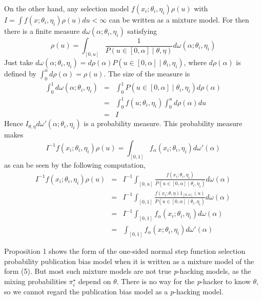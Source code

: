 \documentclass[english]{article}
\begin{document}
On the other hand, any selection model $f(x_{i};\theta_{i},\eta_{i})\rho(u)$ with $I =\int f(x;\theta_{i},\eta_{i})\rho(u)du<\infty$ can be written as a mixture model. For then there is a finite measure $d\omega(\alpha;\theta_{i},\eta_{i})$ satisfying 
\[
\rho(u)=\int_{[0,u]}\frac{1}{P(u\in\left[0,\alpha\right]\mid\theta,\eta)}d\omega(\alpha;\theta_{i},\eta_{i})
\]
Just take $d\omega(\alpha;\theta_{i},\eta_{i})=d\rho(\alpha)P(u\in\left[0,\alpha\right]\mid\theta_{i},\eta_{i})$, where $d\rho(\alpha)$ is defined by $\int_{0}^{u}d\rho(\alpha)=\rho(u)$. The size of the measure is
\begin{eqnarray*}
\int_{0}^{1}d\omega(\alpha;\theta_{i},\eta_{i}) & = & \int_{0}^{1}P(u\in\left[0,\alpha\right]\mid\theta_{i},\eta_{i})d\rho(\alpha)\\
 & = & \int_{0}^{1}f(u;\theta_{i},\eta_{i})\int_{0}^{u}d\rho(\alpha)du\\
 & = & I
\end{eqnarray*}
Hence $I_{\theta,\eta}d\omega'(\alpha;\theta_{i},\eta_{i})$ is a probability measure. This probability measure makes 
\[
I^{-1}f(x_{i};\theta_{i},\eta_{i})\rho(u)=\int_{[0,1]}f_\alpha(x_{i};\theta_{i},\eta_{i})d\omega'(\alpha)
\]
as can be seen by the following computation,
\begin{eqnarray*}
I^{-1}f(x_{i};\theta_{i},\eta_{i})\rho(u) & = & I^{-1}\int_{[0,u]}\frac{f(x_{i};\theta_{i},\eta_{i})}{P(u\in\left[0,\alpha\right]\mid\theta_{i},\eta_{i})}d\omega(\alpha)\\
 & = & I^{-1}\int_{[0,1]}\frac{f(x_{i};\theta,\eta)1_{\left[0,\alpha\right]}(u)}{P(u\in\left[0,\alpha\right]\mid\theta_{i},\eta_{i})}d\omega(\alpha)\\
 & = & I^{-1}\int_{[0,1]}f_\alpha(x_{i};\theta_{i},\eta_{i})d\omega(\alpha)\\
 & = & \int_{[0,1]}f_\alpha(x;\theta_{i},\eta_{i})d\omega'(\alpha)
\end{eqnarray*}

Proposition 1 shows the form of the one-sided normal step function selection probability publication bias model when it is written as a mixture model of the form (5). But most such mixture models are not true \textit{p}-hacking models, as the mixing probabilities $\pi_{i}^{\star}$ depend on $\theta$. There is no way for the \textit{p}-hacker to know
$\theta$, so we cannot regard the publication bias model as a \textit{p}-hacking model.




\end{document}
